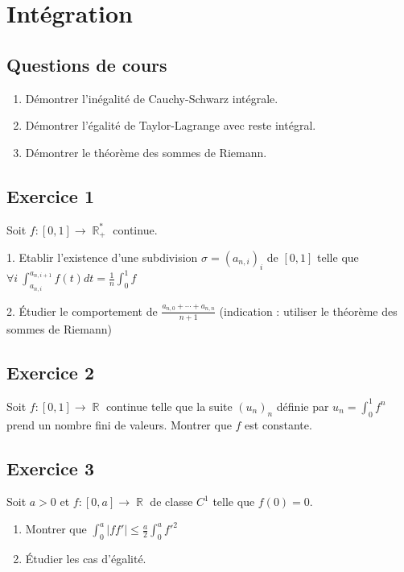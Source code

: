 \documentclass{article}
\DeclareMathOperator{\R}{\mathbb{R}}
\begin{document}
\clearpage

\section{Intégration}

\subsection*{Questions de cours} 

\begin{enumerate}
\item Démontrer l'inégalité de Cauchy-Schwarz intégrale. 

\item Démontrer l'égalité de Taylor-Lagrange avec reste intégral. 

\item Démontrer le théorème des sommes de Riemann. 
\end{enumerate}

\subsection*{Exercice 1} 

Soit $f : [0, 1] \to \R_+^*$ continue. 

1. Etablir l'existence d'une subdivision $\sigma = (a_{n,i})_i$ de $[0, 1]$ telle que $
\forall i \ \displaystyle\int_{a_{n,i}}^{a_{n,i+1}}{f(t)dt} = \frac{1}{n}\int_0^1{f}$ 

2. Étudier le comportement de $\displaystyle\frac{a_{n,0}+\cdots + a_{n,n}}{n+1}$ (indication : utiliser le théorème des sommes de Riemann)

\subsection*{Exercice 2} 

Soit $f : [0, 1] \to \R$ continue telle que la suite $(u_n)_n$ définie par $u_n = \displaystyle\int_0^1{f^n}$ prend un nombre fini de valeurs. Montrer que $f$ est constante. 

\subsection*{Exercice 3} 

Soit $a > 0$ et $f : [0, a] \to \R$ de classe $C^1$ telle que $f(0) = 0$. 

\begin{enumerate}
\item Montrer que $\displaystyle\int_0^a{|ff'|} \leqslant \frac{a}{2} \int_0^a{f'^2}$ 
\item Étudier les cas d'égalité. 
\end{enumerate}
\end{document}
